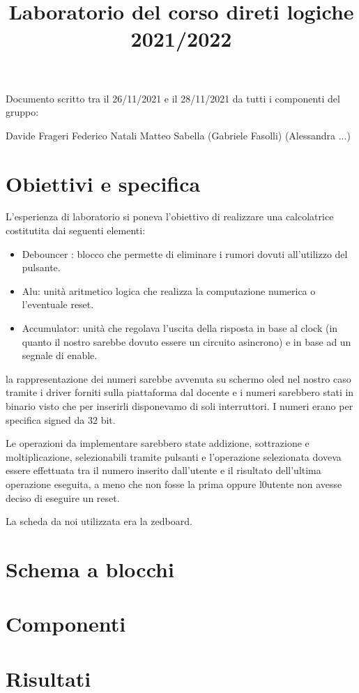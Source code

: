 \documentclass{report}
\title{Laboratorio del corso direti logiche 2021/2022}
\begin{document}
Documento scritto tra il 26/11/2021 e il 28/11/2021 da tutti i componenti del gruppo:

Davide Frageri
Federico Natali
Matteo Sabella
(Gabriele Fasolli)
(Alessandra ...)

\section*{Obiettivi e specifica}

L'esperienza di laboratorio si poneva l'obiettivo di realizzare una calcolatrice costitutita dai seguenti elementi:

\begin{itemize}
\item Debouncer :
blocco che permette di eliminare i rumori dovuti all'utilizzo del pulsante.
\item Alu:
unità aritmetico logica che realizza la computazione  numerica o l'eventuale reset.
\item Accumulator:
unità che regolava l'uscita della risposta in base al clock (in quanto il nostro sarebbe dovuto essere un circuito asincrono) e in base ad un segnale di enable.
\end{itemize}

la rappresentazione dei numeri sarebbe avvenuta su schermo oled nel nostro caso tramite i driver forniti sulla piattaforma dal docente e i numeri sarebbero stati in binario visto che per inserirli disponevamo di soli interruttori.
I numeri erano per specifica signed da 32 bit.

Le operazioni da implementare sarebbero state addizione, sottrazione e moltiplicazione, selezionabili tramite pulsanti e l'operazione selezionata doveva essere effettuata tra il numero inserito dall'utente e il risultato dell'ultima operazione eseguita, a meno che non fosse la prima oppure l0utente non avesse deciso di eseguire un reset.

La scheda da noi utilizzata era la zedboard.


\section*{Schema a blocchi}
\section*{Componenti}
\section*{Risultati}
\end{document}

